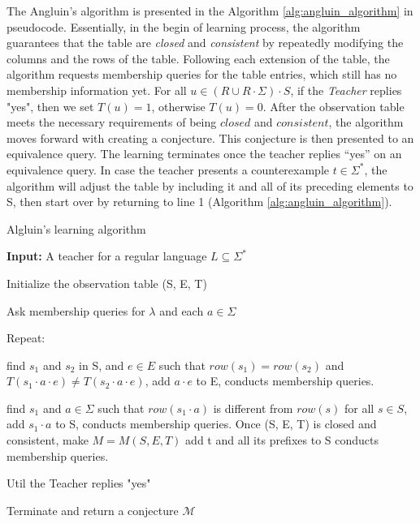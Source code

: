 The Angluin's algorithm is presented in the Algorithm \ref{alg:angluin_algorithm} in pseudocode.
Essentially, in the begin of learning process, the algorithm guarantees that the table are \textit{closed}
and \textit{consistent} by repeatedly modifying the columns and the rows of the table.
Following each extension of the table, the algorithm requests membership queries for the table entries, which still has no membership information yet.
For all $u \in (R \cup R \cdot \Sigma) \cdot S$, if the \textit{Teacher} replies "yes",
then we set $T(u) = 1$, otherwise  $T(u) = 0$.
After the observation table meets the necessary requirements of being $closed$ and $consistent$, the algorithm moves forward with creating a conjecture. 
This conjecture is then presented to an equivalence query.
The learning terminates once the teacher replies “yes” on an equivalence query.
In case the teacher presents a counterexample $t \in \Sigma^*$, the algorithm will adjust the table by including it and all of its preceding elements to S,
then start over by returning to line 1 (Algorithm \ref{alg:angluin_algorithm}).
\begin{algorithm}
    \caption{Algluin's learning algorithm \cite{ANGLUIN198787}}\label{alg:angluin_algorithm}
    \textbf{Input: } A teacher for a regular language $L \subseteq \Sigma^*$
    
    Initialize the observation table (S, E, T)
    
    Ask membership queries for $\lambda$ and each $a \in \Sigma$
    
    Repeat:
        \begin{algorithmic}[1]
                    \State find $s_1$ and $s_2$ in S, and $e \in E$ such that                 
                    \State $row(s_1) = row(s_2)$ and $T(s_1 \cdot a \cdot e) \neq T(s_2 \cdot a \cdot e)$,            
                    \State add $a \cdot e$ to E,      
                    \State conducts membership queries.
                \EndIf

                    \State find $s_1$ and $a \in \Sigma $ such that             
                    \State $row(s_1 \cdot a)$ is different from $row(s)$ for all $s \in S$,            
                    \State add $s_1 \cdot a$ to S,      
                    \State conducts membership queries.
                \EndIf
            \EndWhile
            \State Once (S, E, T) is closed and consistent, make $M = M(S,E,T)$
                    \State add t and all its prefixes to S         
                    \State conducts membership queries.
                \EndIf
        \end{algorithmic}
    Util the Teacher replies "yes"

    Terminate and return a conjecture $\mathcal{M}$
    \end{algorithm}

